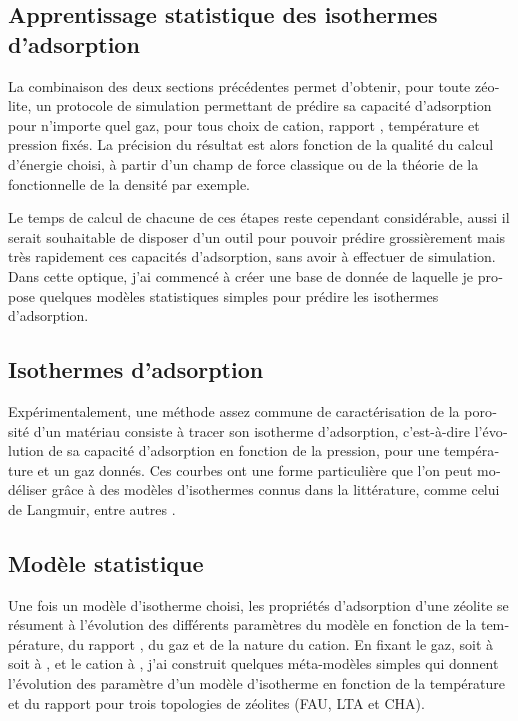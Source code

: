 \documentclass[thesis]{subfiles}
\begin{document}
\begin{otherlanguage}{french}
\section{Apprentissage statistique des isothermes d'adsorption}

La combinaison des deux sections précédentes permet d'obtenir, pour toute zéolite, un protocole de simulation permettant de prédire sa capacité d'adsorption pour n'importe quel gaz, pour tous choix de cation, rapport \SiAl, température et pression fixés. La précision du résultat est alors fonction de la qualité du calcul d'énergie choisi, à partir d'un champ de force classique ou de la théorie de la fonctionnelle de la densité par exemple.

Le temps de calcul de chacune de ces étapes reste cependant considérable, aussi il serait souhaitable de disposer d'un outil pour pouvoir prédire grossièrement mais très rapidement ces capacités d'adsorption, sans avoir à effectuer de simulation. Dans cette optique, j'ai commencé à créer une base de donnée de laquelle je propose quelques modèles statistiques simples pour prédire les isothermes d'adsorption.

\subsection{Isothermes d'adsorption}

Expérimentalement, une méthode assez commune de caractérisation de la porosité d'un matériau consiste à tracer son isotherme d'adsorption, c'est-à-dire l'évolution de sa capacité d'adsorption en fonction de la pression, pour une température et un gaz donnés. Ces courbes ont une forme particulière que l'on peut modéliser grâce à des modèles d'isothermes connus dans la littérature, comme celui de Langmuir, entre autres \autocite{AyaweiIsothermModels}.

\subsection{Modèle statistique}

Une fois un modèle d'isotherme choisi, les propriétés d'adsorption d'une zéolite se résument à l'évolution des différents paramètres du modèle en fonction de la température, du rapport \SiAl, du gaz et de la nature du cation. En fixant le gaz, soit à  soit à , et le cation à , j'ai construit quelques méta-modèles simples qui donnent l'évolution des paramètre d'un modèle d'isotherme en fonction de la température et du rapport \SiAl pour trois topologies de zéolites (FAU, LTA et CHA).


\end{otherlanguage}
\end{document}
